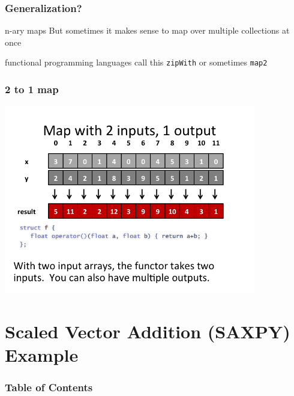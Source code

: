 \documentclass[xcolor=dvipsnames]{beamer}
\begin{document}
		\begin{frame} \frametitle{Generalization?}
			\begin{block}{n-ary maps}
				But sometimes it makes sense to map over multiple collections at 
	            once 
			\end{block}
			functional programming languages call this \texttt{zipWith} or 
			sometimes \texttt{map2}
		\end{frame}
			
		\begin{frame} \frametitle{2 to 1 map}
			\includegraphics[width=110mm]{images/map2to1.png}
		\end{frame} 


\section{Scaled Vector Addition (SAXPY) Example} 

	\begin{frame} \frametitle{Table of Contents}
		\tableofcontents[currentsection]
	\end{frame} 
	
\end{document}
